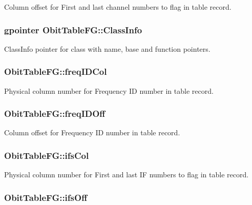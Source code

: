Column offset for First and last channel numbers to flag in table record. 

\subsubsection{\setlength{\rightskip}{0pt plus 5cm}gpointer {\bf Obit\-Table\-FG::Class\-Info}}\label{structObitTableFG_o1}


Class\-Info pointer for class with name, base and function pointers. 

\subsubsection{ {\bf Obit\-Table\-FG::freq\-IDCol}}\label{structObitTableFG_o20}


Physical column number for Frequency ID number in table record. 

\subsubsection{ {\bf Obit\-Table\-FG::freq\-IDOff}}\label{structObitTableFG_o19}


Column offset for Frequency ID number in table record. 

\subsubsection{ {\bf Obit\-Table\-FG::ifs\-Col}}\label{structObitTableFG_o26}


Physical column number for First and last IF numbers to flag in table record. 

\subsubsection{ {\bf Obit\-Table\-FG::ifs\-Off}}\label{structObitTableFG_o25}


